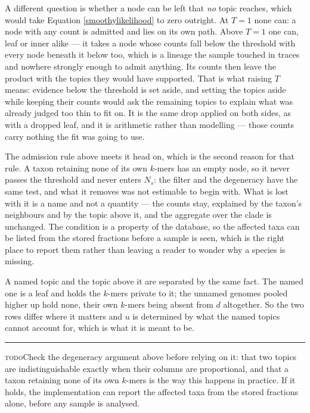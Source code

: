 \documentclass[pdflatex,sn-vancouver-num]{sn-jnl}
\newif\ifshowtodos \showtodostrue
\newcommand{\todo}[1]{%
  \ifshowtodos
    \par\addvspace{0.7\baselineskip}%
    \begin{list}{}{%
      \setlength{\leftmargin}{1.5em}%
      \setlength{\rightmargin}{1.5em}%
      \setlength{\topsep}{0pt}%
      \setlength{\partopsep}{0pt}%
      \setlength{\parsep}{0.5\baselineskip}%
      \setlength{\itemsep}{0pt}%
    }%
    \item[]\footnotesize\color{black!70}%
      \textcolor{orange!65!black}{\rule[-0.2ex]{2pt}{1.15ex}}\hspace{0.55em}%
      \textcolor{orange!65!black}{\textsc{todo}}\hspace{0.6em}\ignorespaces#1%
    \end{list}%
    \addvspace{0.7\baselineskip}%
  \fi%
}
\begin{document}
    A different question is whether a node can be left that \emph{no} topic reaches, which would take
    Equation \eqref{smoothylikelihood} to zero outright. At $T = 1$ none can: a node with any count
    is admitted and lies on its own path. Above $T = 1$ one can, leaf or inner alike --- it takes a
    node whose counts fall below the threshold with every node beneath it below too, which is a
    lineage the sample touched in traces and nowhere strongly enough to admit anything. Its counts
    then leave the product with the topics they would have supported. That is what raising $T$ means:
    evidence below the threshold is set aside, and setting the topics aside while keeping their
    counts would ask the remaining topics to explain what was already judged too thin to fit on. It
    is the same drop applied on both sides, as with a dropped leaf, and it is arithmetic rather than
    modelling --- those counts carry nothing the fit was going to use.

    The admission rule above meets it head on, which is the second reason for that rule. A taxon
    retaining none of its own $k$-mers has an empty node, so it never passes the threshold and never
    enters $N_s$: the filter and the degeneracy have the same test, and what it removes was not
    estimable to begin with. What is lost with it is a name and not a quantity --- the counts stay,
    explained by the taxon's neighbours and by the topic above it, and the aggregate over
    the clade is unchanged. The condition is a property of the database, so the affected taxa can be
    listed from the stored fractions before a sample is seen, which is the right place to report them
    rather than leaving a reader to wonder why a species is missing.

    A named topic and the topic above it are separated by the same fact. The named one is a leaf and
    holds the $k$-mers private to it; the unnamed genomes pooled higher up hold none, their own
    $k$-mers being absent from $d$ altogether. So the two rows differ where it matters and $u$ is
    determined by what the named topics cannot account for, which is what it is meant to be.

    \todo{Check the degeneracy argument above before relying on it: that two topics
    are indistinguishable exactly when their columns are proportional, and that a taxon retaining
    none of its own $k$-mers is the way this happens in practice. If it holds, the implementation can
    report the affected taxa from the stored fractions alone, before any sample is analysed.}
\end{document}
